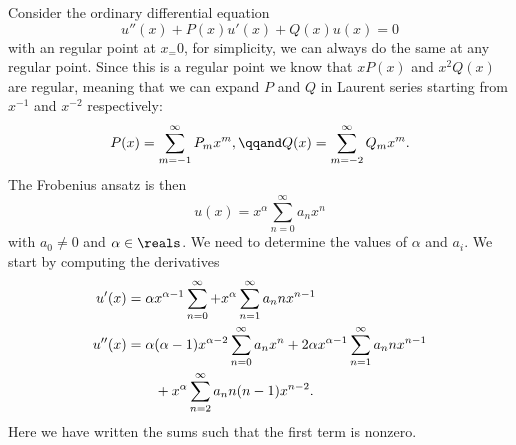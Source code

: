 \documentclass[fleqn]{NotesClass}
\begin{document}
    Consider the ordinary differential equation
    \begin{equation}
        u''(x) + P(x)u'(x) + Q(x)u(x) = 0
    \end{equation}
    with an regular point at \(x_ = 0\), for simplicity, we can always do the same at any regular point.
    Since this is a regular point we know that \(xP(x)\) and \(x^2Q(x)\) are regular, meaning that we can expand \(P\) and \(Q\) in Laurent series starting from \(x^{-1}\) and \(x^{-2}\) respectively:
    \begin{equation}
        P(x) = \sum_{m=-1}^{\infty} P_mx^m, \qqand Q(x) = \sum_{m=-2}^{\infty} Q_mx^{m}.
    \end{equation}
    The Frobenius ansatz is then
    \begin{equation}
        u(x) = x^\alpha \sum_{n=0}^{\infty} a_nx^n
    \end{equation}
    with \(a_0 \ne 0\) and \(\alpha \in \reals\).
    We need to determine the values of \(\alpha\) and \(a_i\).
    We start by computing the derivatives
    \begin{align}
        u'(x) &= \alpha x^{\alpha-1}\sum_{n=0}^{\infty}  + x^\alpha \sum_{n=1}^{\infty} a_nnx^{n-1}\\
        u''(x) &= \alpha(\alpha - 1)x^{\alpha - 2} \sum_{n=0}^{\infty} a_nx^n + 2\alpha x^{\alpha - 1} \sum_{n=1}^{\infty} a_n nx^{n-1}\notag\\
        &\qquad+ x^\alpha \sum_{n=2}^{\infty} a_nn(n - 1) x^{n-2}.
    \end{align}
    Here we have written the sums such that the first term is nonzero.
    
\end{document}
